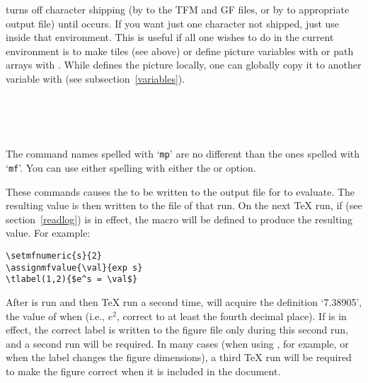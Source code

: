 \documentclass[letterpaper]{article}
\begin{document}
 turns off character shipping (by \MF{} to the TFM and
GF files, or by \MP{} to appropriate \EPS{} output file) until
 occurs. If you want just one character not shipped,
just use  inside that  environment. This is useful
if all one wishes to do in the current  environment is to
make tiles (see above) or define picture variables with  or
path arrays with . While  defines the picture
locally, one can globally copy it to another variable with
 (see subsection~\ref{variables}).

\begin{cd}
\\
\\
\\
%
%
%
%
%
\end{cd}

The command names spelled with `\texttt{mp}' are no different than the
ones spelled with `\texttt{mf}'. You can use either spelling with
either the  or  option.

These commands causes the  to be written to the output
file for \MF{} to evaluate. The resulting value is then written to the
 file of that \MF{} run. On the next \TeX{} run, if
 (see section~\ref{readlog}) is in effect, the macro
 will be defined to produce the resulting value. For
example:
\begin{verbatim}
\setmfnumeric{s}{2}
\assignmfvalue{\val}{exp s}
\tlabel(1,2){$e^s = \val$}
\end{verbatim}
After \MF{} is run and then \TeX{} run a second time,  will
acquire the definition `7.38905', the value of  when
 (i.e., $e^2$, correct to at least the fourth decimal place).
If  is in effect, the correct label is written to the
figure file only during this second run, and a second \MP{} run will be
required. In many cases (when using \pdfTeX{}, for example, or when the
label changes the figure dimensions), a third \TeX{} run will be
required to make the figure correct when it is included in the document.
\end{document}
